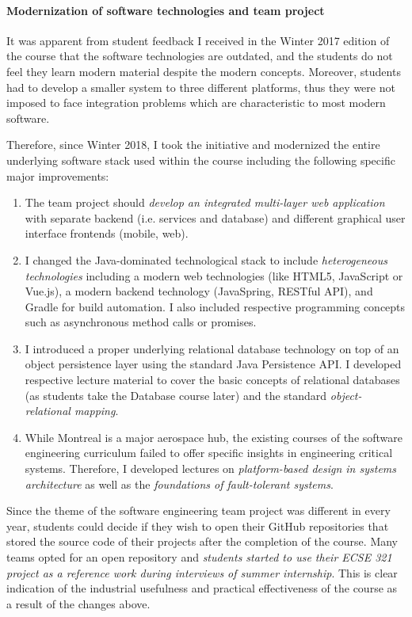\documentclass[a4paper,11pt]{article}
\begin{document}
\paragraph{Modernization of software technologies and team project}
It was apparent from student feedback I received in the Winter 2017 edition of the course that the software technologies are outdated, and the students do not feel they learn modern material despite the modern concepts. Moreover, students had to develop a smaller system to three different platforms, thus they were not imposed to face integration problems which are characteristic to most modern software.

Therefore, since Winter 2018, I took the initiative and modernized the entire underlying software stack used within the course including the following specific major improvements:
\begin{enumerate}
\item The team project should \emph{develop an integrated multi-layer web application} with separate backend (i.e. services and database) and different graphical user interface frontends (mobile, web). 
\item I changed the Java-dominated technological stack to include \emph{heterogeneous technologies} including a modern web technologies (like HTML5, JavaScript or Vue.js), a modern backend technology (JavaSpring, RESTful API), and Gradle for build automation. I also included respective programming concepts such as asynchronous method calls or promises. 
\item I introduced a proper underlying relational database technology on top of an object persistence layer using the standard Java Persistence API. I developed respective lecture material to cover the basic concepts of relational databases (as students take the Database course later) and the standard \emph{object-relational mapping}.  
\item While Montreal is a major aerospace hub, the existing courses of the software engineering curriculum failed to offer specific insights in engineering critical systems. Therefore, I developed lectures on \emph{platform-based design in systems architecture} as well as the \emph{foundations of fault-tolerant systems}.
\end{enumerate}

Since the theme of the software engineering team project was different in every year, students could decide if they wish to open their GitHub repositories that stored the source code of their projects after the completion of the course. Many teams opted for an open repository and \emph{students started to use their ECSE 321 project as a reference work during interviews of summer internship}. This is clear indication of the industrial usefulness and practical effectiveness of the course as a result of the changes above. 
\end{document}
